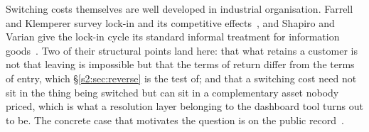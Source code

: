 Switching costs themselves are well developed in industrial organisation. Farrell and
Klemperer survey lock-in and its competitive effects~\citep{farrell2007}, and Shapiro and
Varian give the lock-in cycle its standard informal treatment for information
goods~\citep{shapiro1999}. Two of their structural points land here: that what retains a
customer is not that leaving is impossible but that the terms of return differ from the
terms of entry, which \S\ref{s2:sec:reverse} is the test of; and that a switching cost need
not sit in the thing being switched but can sit in a complementary asset nobody priced,
which is what a resolution layer belonging to the dashboard tool turns out to be. The
concrete case that motivates the question is on the public record~\citep{orosz2023}.
